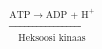 \documentclass[preview]{standalone}
\begin{document}
\begin{align*}
\xrightarrow[\text{Heksoosi kinaas}]{\text{ATP} \rightarrow \text{ADP + H}^{+}}
\end{align*}
\end{document}
